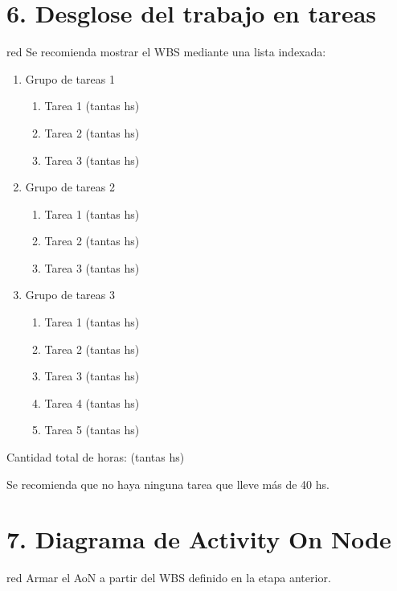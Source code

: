 \documentclass[11pt]{charter}
\begin{document}
\section{6. Desglose del trabajo en tareas}
\label{sec:wbs}

\begin{consigna}{red}
Se recomienda mostrar el WBS mediante una lista indexada:

\begin{enumerate}
\item Grupo de tareas 1
	\begin{enumerate}
	\item Tarea 1 (tantas hs)
	\item Tarea 2 (tantas hs)
	\item Tarea 3 (tantas hs)
	\end{enumerate}
\item Grupo de tareas 2
	\begin{enumerate}
	\item Tarea 1 (tantas hs)
	\item Tarea 2 (tantas hs)
	\item Tarea 3 (tantas hs)
	\end{enumerate}
	\item Grupo de tareas 3
	\begin{enumerate}
	\item Tarea 1 (tantas hs)
	\item Tarea 2 (tantas hs)
	\item Tarea 3 (tantas hs)
	\item Tarea 4 (tantas hs)
	\item Tarea 5 (tantas hs)
	\end{enumerate}
\end{enumerate}

Cantidad total de horas: (tantas hs)

Se recomienda que no haya ninguna tarea que lleve más de 40 hs. 

\end{consigna}

\section{7. Diagrama de Activity On Node}
\label{sec:AoN}

\begin{consigna}{red}
Armar el AoN a partir del WBS definido en la etapa anterior. 



\end{consigna}
\end{document}
